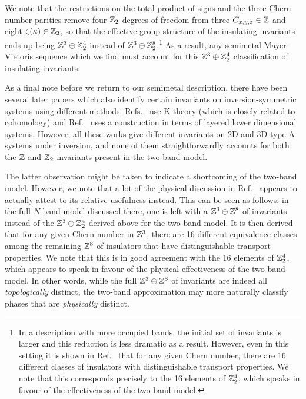 We note that the restrictions on the total product of signs and the three Chern number parities remove four $\mathbb{Z}_2$ degrees of freedom from three $C_{x,y,z}\in\mathbb{Z}$ and eight $\zeta(\kappa)\in\mathbb{Z}_2$, so that the effective group structure of the insulating invariants ends up being $\mathbb{Z}^3\oplus\mathbb{Z}_2^4$ instead of $\mathbb{Z}^3\oplus\mathbb{Z}_2^8$.\footnote{
	In a description with more occupied bands, the initial set of invariants is larger and this reduction is less dramatic as a result. However, even in this setting it is shown in Ref.~\cite{Turner_inversion} that for any given Chern number, there are 16 different classes of insulators with distinguishable transport properties. We note that this corresponds precisely to the 16 elements of $\mathbb{Z}_2^4$, which speaks in favour of the effectiveness of the two-band model.}
As a result, any semimetal Mayer--Vietoris sequence which we find must account for this $\mathbb{Z}^3\oplus\mathbb{Z}_2^4$ classification of insulating invariants.

As a final note before we return to our semimetal description, there have been several later papers which also identify certain invariants on inversion-symmetric systems using different methods: Refs.~\cite{LuLee_inversion,ShiozakiSato_order-two} use K-theory (which is closely related to cohomology) and Ref.~\cite{Khalaf_inversion} uses a construction in terms of layered lower dimensional systems. However, all these works give different invariants on 2D and 3D type A systems under inversion, and none of them straightforwardly accounts for both the $\mathbb{Z}$ and $\mathbb{Z}_2$ invariants present in the two-band model.

The latter observation might be taken to indicate a shortcoming of the two-band model. However, we note that a lot of the physical discussion in Ref.~\cite{Turner_inversion} appears to actually attest to its relative usefulness instead. This can be seen as follows: in the full $N$-band model discussed there, one is left with a $\mathbb{Z}^3\oplus\mathbb{Z}^8$ of invariants instead of the $\mathbb{Z}^3\oplus \mathbb{Z}_2^4$ derived above for the two-band model. It is then derived that for any given Chern number in $\mathbb{Z}^3$, there are 16 different equivalence classes among the remaining $\mathbb{Z}^8$ of insulators that have distinguishable transport properties. We note that this is in good agreement with the 16 elements of $\mathbb{Z}_2^4$, which appears to speak in favour of the physical effectiveness of the two-band model. In other words, while the full $\mathbb{Z}^3\oplus\mathbb{Z}^8$ of invariants are indeed all \emph{topologically} distinct, the two-band approximation may more naturally classify phases that are \emph{physically} distinct.


